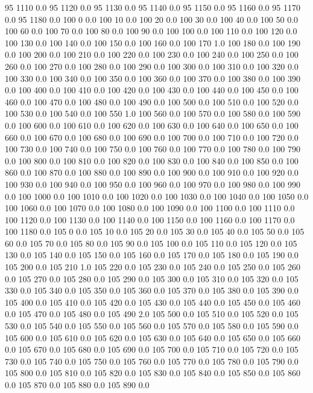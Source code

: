 95	1110	0.0
95	1120	0.0
95	1130	0.0
95	1140	0.0
95	1150	0.0
95	1160	0.0
95	1170	0.0
95	1180	0.0
100	0	0.0
100	10	0.0
100	20	0.0
100	30	0.0
100	40	0.0
100	50	0.0
100	60	0.0
100	70	0.0
100	80	0.0
100	90	0.0
100	100	0.0
100	110	0.0
100	120	0.0
100	130	0.0
100	140	0.0
100	150	0.0
100	160	0.0
100	170	1.0
100	180	0.0
100	190	0.0
100	200	0.0
100	210	0.0
100	220	0.0
100	230	0.0
100	240	0.0
100	250	0.0
100	260	0.0
100	270	0.0
100	280	0.0
100	290	0.0
100	300	0.0
100	310	0.0
100	320	0.0
100	330	0.0
100	340	0.0
100	350	0.0
100	360	0.0
100	370	0.0
100	380	0.0
100	390	0.0
100	400	0.0
100	410	0.0
100	420	0.0
100	430	0.0
100	440	0.0
100	450	0.0
100	460	0.0
100	470	0.0
100	480	0.0
100	490	0.0
100	500	0.0
100	510	0.0
100	520	0.0
100	530	0.0
100	540	0.0
100	550	1.0
100	560	0.0
100	570	0.0
100	580	0.0
100	590	0.0
100	600	0.0
100	610	0.0
100	620	0.0
100	630	0.0
100	640	0.0
100	650	0.0
100	660	0.0
100	670	0.0
100	680	0.0
100	690	0.0
100	700	0.0
100	710	0.0
100	720	0.0
100	730	0.0
100	740	0.0
100	750	0.0
100	760	0.0
100	770	0.0
100	780	0.0
100	790	0.0
100	800	0.0
100	810	0.0
100	820	0.0
100	830	0.0
100	840	0.0
100	850	0.0
100	860	0.0
100	870	0.0
100	880	0.0
100	890	0.0
100	900	0.0
100	910	0.0
100	920	0.0
100	930	0.0
100	940	0.0
100	950	0.0
100	960	0.0
100	970	0.0
100	980	0.0
100	990	0.0
100	1000	0.0
100	1010	0.0
100	1020	0.0
100	1030	0.0
100	1040	0.0
100	1050	0.0
100	1060	0.0
100	1070	0.0
100	1080	0.0
100	1090	0.0
100	1100	0.0
100	1110	0.0
100	1120	0.0
100	1130	0.0
100	1140	0.0
100	1150	0.0
100	1160	0.0
100	1170	0.0
100	1180	0.0
105	0	0.0
105	10	0.0
105	20	0.0
105	30	0.0
105	40	0.0
105	50	0.0
105	60	0.0
105	70	0.0
105	80	0.0
105	90	0.0
105	100	0.0
105	110	0.0
105	120	0.0
105	130	0.0
105	140	0.0
105	150	0.0
105	160	0.0
105	170	0.0
105	180	0.0
105	190	0.0
105	200	0.0
105	210	1.0
105	220	0.0
105	230	0.0
105	240	0.0
105	250	0.0
105	260	0.0
105	270	0.0
105	280	0.0
105	290	0.0
105	300	0.0
105	310	0.0
105	320	0.0
105	330	0.0
105	340	0.0
105	350	0.0
105	360	0.0
105	370	0.0
105	380	0.0
105	390	0.0
105	400	0.0
105	410	0.0
105	420	0.0
105	430	0.0
105	440	0.0
105	450	0.0
105	460	0.0
105	470	0.0
105	480	0.0
105	490	2.0
105	500	0.0
105	510	0.0
105	520	0.0
105	530	0.0
105	540	0.0
105	550	0.0
105	560	0.0
105	570	0.0
105	580	0.0
105	590	0.0
105	600	0.0
105	610	0.0
105	620	0.0
105	630	0.0
105	640	0.0
105	650	0.0
105	660	0.0
105	670	0.0
105	680	0.0
105	690	0.0
105	700	0.0
105	710	0.0
105	720	0.0
105	730	0.0
105	740	0.0
105	750	0.0
105	760	0.0
105	770	0.0
105	780	0.0
105	790	0.0
105	800	0.0
105	810	0.0
105	820	0.0
105	830	0.0
105	840	0.0
105	850	0.0
105	860	0.0
105	870	0.0
105	880	0.0
105	890	0.0
